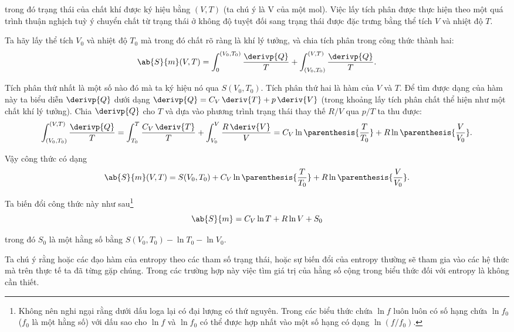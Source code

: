 \noindent
trong đó trạng thái của chất khí được ký hiệu bằng $(V, T)$ (ta chú ý là V của một mol). Việc lấy tích phân được thực hiện theo một quá trình thuận nghịch tuỳ ý chuyển chất từ trạng thái ở không độ tuyệt đối sang trạng thái được đặc trưng bằng thể tích $V$ và nhiệt độ $T$.

Ta hãy lấy thể tích $V_0$ và nhiệt độ $T_0$ mà trong đó chất rõ ràng là khí lý tưởng, và chia tích phân trong công thức  thành hai:
\begin{equation}\label{eq:12_34}
	\ab{S}{m}(V,T) = \int_{0}^{(V_0,T_0)} \frac{\derivp{Q}}{T} + \int_{(V_0,T_0)}^{(V,T)} \frac{\derivp{Q}}{T}.
\end{equation}

\noindent
Tích phân thứ nhất là một số nào đó mà ta ký hiệu nó qua $S(V_0,T_0)$. Tích phân thứ hai là hàm của $V$ và $T$. Để tìm được dạng của hàm này ta biểu diễn $\derivp{Q}$ dưới dạng $\derivp{Q}=C_V\,\deriv{T}+p\,\deriv{V}$ (trong khoảng lấy tích phân chất thể hiện như một chất khí lý tưởng). Chia $\derivp{Q}$ cho $T$ và dựa vào phương trình trạng thái thay thế $R/V$ qua $p/T$ ta thu được:
\begin{equation*}
	\int_{(V_0,T_0)}^{(V,T)} \frac{\derivp{Q}}{T} = \int_{T_0}^{T} \frac{C_V\,\deriv{T}}{T} + \int_{V_0}^{V} \frac{R\,\deriv{V}}{V} = C_V\ln\parenthesis{\frac{T}{T_0}} + R\ln\parenthesis{\frac{V}{V_0}}.
\end{equation*}

\noindent
Vậy công thức  có dạng
\begin{equation}\label{eq:12_35}
	\ab{S}{m}(V,T) = S(V_0,T_0) + C_V\ln\parenthesis{\frac{T}{T_0}} + R\ln\parenthesis{\frac{V}{V_0}}.
\end{equation}

\noindent
Ta biến đổi công thức này như sau\footnote{Không nên nghi ngại rằng dưới dấu loga lại có đại lượng có thứ nguyên. Trong các biểu thức chứa $\ln{f}$ luôn luôn có số hạng chứa $\ln{f_0}$ ($f_0$ là một hằng số) với dấu sao cho $\ln{f}$ và $\ln{f_0}$ có thể được hợp nhất vào một số hạng có dạng $\ln(f/f_0)$.}
\begin{equation}\label{eq:12_36}
	\ab{S}{m} = C_V\ln{T} + R\ln{V} + S_0
\end{equation}

\noindent
trong đó $S_0$ là một hằng số bằng $S(V_0,T_0)-\ln{T_0}-\ln{V_0}$.

Ta chú ý rằng hoặc các đạo hàm của entropy theo các tham số trạng thái, hoặc sự biến đổi của entropy thường sẽ tham gia vào các hệ thức mà trên thực tế ta đã từng gặp chúng. Trong các trường hợp này việc tìm giá trị của hằng số cộng trong biểu thức đối với entropy là không cần thiết.

